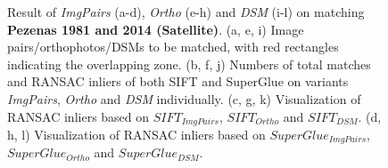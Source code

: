 \begin{figure}[htbp]
\begin{center}
{\begin{minipage}[t]{0.48\linewidth}
			\end{minipage}%
		}
		\caption{{ Result of \textit{ImgPairs} (a-d), \textit{Ortho} (e-h) and \textit{DSM} (i-l) on matching \textbf{Pezenas 1981 and 2014 (Satellite)}. (a, e, i) Image pairs/orthophotos/DSMs to be matched, with red rectangles indicating the overlapping zone. (b, f, j) Numbers of total matches and RANSAC inliers of both SIFT and SuperGlue on variants \textit{ImgPairs}, \textit{Ortho} and \textit{DSM} individually. (c, g, k) Visualization of RANSAC inliers based on $SIFT_{ImgPairs}$, $SIFT_{Ortho}$ and $SIFT_{DSM}$. (d, h, l) Visualization of RANSAC inliers based on $SuperGlue_{ImgPairs}$, $SuperGlue_{Ortho}$ and $SuperGlue_{DSM}$.}}        
		\label{MatchVizPezenas-Satellite1981DSM}
	\end{center}
\end{figure} 



